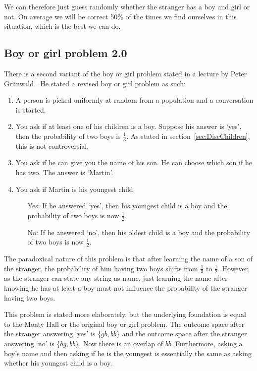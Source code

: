 \documentclass[a4paper]{report}
\theoremstyle{plain}
\theoremstyle{definition}
\theoremstyle{remark}
\numberwithin{equation}{chapter}
\DeclareMathOperator{\1}{\mathbbm{1}}
\begin{document}
We can therefore just guess randomly whether the stranger has a boy and girl or not. On average we will be correct 50\% of the times we find ourselves in this situation, which is the best we can do.

\subsection{Boy or girl problem 2.0}
There is a second variant of the boy or girl problem stated in a lecture by Peter Grünwald \cite{Grunwald19}. He stated a revised boy or girl problem as such:
\begin{enumerate}
    \item A person is picked uniformly at random from a population and a conversation is started.
    \item You ask if at least one of his children is a boy. Suppose his answer is `yes', then the probability of two boys is $\frac{1}{3}$. As stated in section~\ref{sec:DiscChildren}, this is not controversial.
    \item You ask if he can give you the name of his son. He can choose which son if he has two. The answer is `Martin'.
    \item You ask if Martin is his youngest child.
    \begin{itemize}
        \item[Yes:] If he answered `yes', then his youngest child is a boy and the probability of two boys is now $\frac{1}{2}$.
        \item[No:] If he answered `no', then his oldest child is a boy and the probability of two boys is now $\frac{1}{2}$.
    \end{itemize}
\end{enumerate}

The paradoxical nature of this problem is that after learning the name of a son of the stranger, the probability of him having two boys shifts from $\frac{1}{3}$ to $\frac{1}{2}$. However, as the stranger can state any string as name, just learning the name after knowing he has at least a boy must not influence the probability of the stranger having two boys.

This problem is stated more elaborately, but the underlying foundation is equal to the Monty Hall or the original boy or girl problem. The outcome space after the stranger answering `yes' is $\{gb,bb\}$ and the outcome space after the stranger answering `no' is $\{bg, bb\}$. Now there is an overlap of $bb$. Furthermore, asking a boy's name and then asking if he is the youngest is essentially the same as asking whether his youngest child is a boy.
\end{document}
